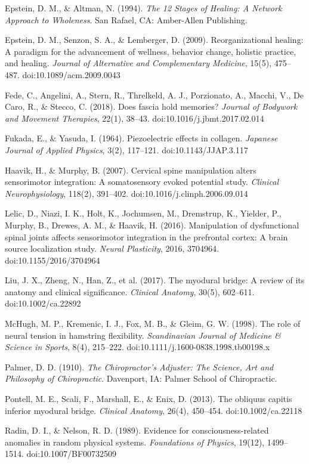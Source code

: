 \documentclass[11pt,letterpaper]{article}
\begin{document}
Epstein, D. M., \& Altman, N. (1994). \textit{The 12 Stages of Healing: A Network Approach to Wholeness}. San Rafael, CA: Amber-Allen Publishing.


Epstein, D. M., Senzon, S. A., \& Lemberger, D. (2009). Reorganizational healing: A paradigm for the advancement of wellness, behavior change, holistic practice, and healing. \textit{Journal of Alternative and Complementary Medicine}, 15(5), 475–487. doi:10.1089/acm.2009.0043


Fede, C., Angelini, A., Stern, R., Threlkeld, A. J., Porzionato, A., Macchi, V., De Caro, R., \& Stecco, C. (2018). Does fascia hold memories? \textit{Journal of Bodywork and Movement Therapies}, 22(1), 38–43. doi:10.1016/j.jbmt.2017.02.014


Fukada, E., \& Yasuda, I. (1964). Piezoelectric effects in collagen. \textit{Japanese Journal of Applied Physics}, 3(2), 117–121. doi:10.1143/JJAP.3.117


Haavik, H., \& Murphy, B. (2007). Cervical spine manipulation alters sensorimotor integration: A somatosensory evoked potential study. \textit{Clinical Neurophysiology}, 118(2), 391–402. doi:10.1016/j.clinph.2006.09.014


Lelic, D., Niazi, I. K., Holt, K., Jochumsen, M., Dremstrup, K., Yielder, P., Murphy, B., Drewes, A. M., \& Haavik, H. (2016). Manipulation of dysfunctional spinal joints affects sensorimotor integration in the prefrontal cortex: A brain source localization study. \textit{Neural Plasticity}, 2016, 3704964. doi:10.1155/2016/3704964


Liu, J. X., Zheng, N., Han, Z., et al. (2017). The myodural bridge: A review of its anatomy and clinical significance. \textit{Clinical Anatomy}, 30(5), 602–611. doi:10.1002/ca.22892


McHugh, M. P., Kremenic, I. J., Fox, M. B., \& Gleim, G. W. (1998). The role of neural tension in hamstring flexibility. \textit{Scandinavian Journal of Medicine \& Science in Sports}, 8(4), 215–222. doi:10.1111/j.1600-0838.1998.tb00198.x


Palmer, D. D. (1910). \textit{The Chiropractor's Adjuster: The Science, Art and Philosophy of Chiropractic}. Davenport, IA: Palmer School of Chiropractic.


Pontell, M. E., Scali, F., Marshall, E., \& Enix, D. (2013). The obliquus capitis inferior myodural bridge. \textit{Clinical Anatomy}, 26(4), 450–454. doi:10.1002/ca.22118


Radin, D. I., \& Nelson, R. D. (1989). Evidence for consciousness-related anomalies in random physical systems. \textit{Foundations of Physics}, 19(12), 1499–1514. doi:10.1007/BF00732509
\end{document}

